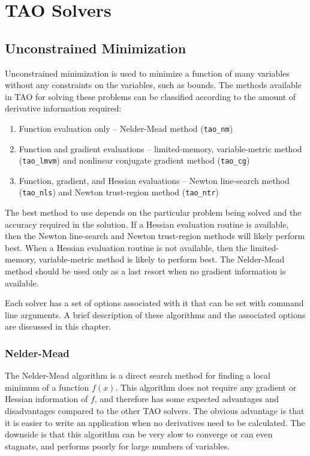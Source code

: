 
\chapter{TAO Solvers}

\section{Unconstrained Minimization}
\label{chapter:unconstrained}
Unconstrained minimization is used to minimize a function of many variables
without any constraints on the variables, such as bounds.  The methods 
available in TAO for solving these problems can be classified according
to the amount of derivative information required:
\begin{enumerate}
\item Function evaluation only -- Nelder-Mead method ({\tt tao\_nm})
\item Function and gradient evaluations -- limited-memory, variable-metric 
method ({\tt tao\_lmvm}) and nonlinear conjugate gradient method 
({\tt tao\_cg})
\item Function, gradient, and Hessian evaluations -- Newton line-search 
method ({\tt tao\_nls}) and Newton trust-region method ({\tt tao\_ntr})
\end{enumerate}
The best method to use depends on the particular problem being solved
and the accuracy required in the solution.  If a Hessian evaluation 
routine is available, then the Newton line-search and Newton trust-region 
methods will likely perform best.  When a Hessian evaluation routine
is not available, then the limited-memory, variable-metric method is 
likely to perform best.  The Nelder-Mead method should be used only
as a last resort when no gradient information is available.

Each solver has a set of options associated with it that can be set with 
command line arguments.  A brief description of these algorithms and the 
associated options are discussed in this chapter.

\subsection{Nelder-Mead}
The Nelder-Mead algorithm \cite{nelder.mead:simplex} is a direct search method for finding a local
minimum of a function $f(x)$.  This algorithm does not require any gradient or Hessian 
information of $f$, and therefore has some expected advantages and disadvantages compared
to the other TAO solvers.  The obvious advantage is that it is easier to write an 
application when no derivatives need to be calculated.  The downside is that this algorithm can
be very slow to converge or can even stagnate, and performs poorly for large numbers of variables.

